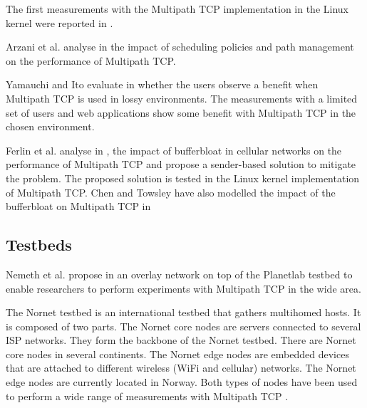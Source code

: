 The first measurements with the Multipath TCP implementation in the Linux kernel were reported in \cite{Barre_Multipath:2011}.


Arzani et al. analyse in \cite{Arzani_Impact:2014} the impact of scheduling policies and path management on the performance of Multipath TCP. 

Yamauchi and Ito evaluate in \cite{Yamauchi_Web:2014} whether the users observe a benefit when Multipath TCP is used in lossy environments. The measurements with a limited set of users and web applications show some benefit with Multipath TCP in the chosen environment.

Ferlin et al. analyse in \cite{Ferlin_Bufferbloat:2014}, the impact of bufferbloat in cellular networks on the performance of Multipath TCP and propose a sender-based solution to mitigate the problem. The proposed solution is tested in the Linux kernel implementation of Multipath TCP. Chen and Towsley have also modelled the impact of the bufferbloat on Multipath TCP in \cite{Chen_Bufferbloat:2014}

\subsection{Testbeds}

Nemeth et al. propose in \cite{Nemeth_Playground:2013} an overlay network on top of the Planetlab testbed to enable researchers to perform experiments with Multipath TCP in the wide area. 


The Nornet testbed \cite{Gunnar_Nornet:2014,Kvalbein_Nornet:2014} is an international testbed that gathers multihomed hosts. It is composed of two parts. The Nornet core nodes \cite{Gunnar_Nornet:2014} are servers connected to several ISP networks. They form the backbone of the Nornet testbed. There are Nornet core nodes in several continents. The Nornet edge nodes \cite{Kvalbein_Nornet:2014} are embedded devices that are attached to different wireless (WiFi and cellular) networks. The Nornet edge nodes are currently located in Norway. Both types of nodes have been used to perform a wide range of measurements with Multipath TCP \cite{draft-dreibholz-mptcp-nornet-experience}.
